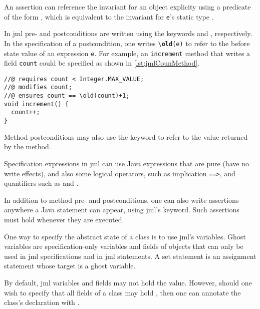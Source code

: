 An assertion can reference the invariant for an object explicity using
a predicate of the form , which is
equivalent to the invariant for \texttt{e}'s static type \cite[section
12.4.22]{Leavens&13}.

In \ac{jml} pre- and postconditions are written using the keywords
 and , respectively. In the specification of
a postcondition, one writes \texttt{\textbackslash \textbf{old}(e)} to
refer to the before state value of an expression \texttt{e}.  For
example, an \texttt{increment} method that writes a field
\texttt{count} could be specified as shown in
\autoref{lst:jmlCounMethod}.

\begin{lstlisting}[style=customJml,label={lst:jmlCounMethod},caption={Example of a \ac{jml} specification for a Java method.}]
//@ requires count < Integer.MAX_VALUE;
//@ modifies count;
//@ ensures count == \old(count)+1;
void increment() {
  count++;
}
\end{lstlisting}
Method postconditions may also use the keyword {\RESULT} to refer to
the value returned by the method.

Specification expressions in \ac{jml} can use Java expressions that
are pure (have no write effects), and also some logical operators,
such as implication \texttt{==>}, and quantifiers such as {\JMLforall}
and {\JMLexists}.

In addition to method pre- and postconditions, one can also write
assertions anywhere a Java statement can appear, using \ac{jml}'s
 keyword. Such assertions must hold whenever they are executed.

One way to specify the abstract state of a class is to use \ac{jml}'s
 variables. Ghost variables are specification-only variables
and fields of objects that can only be used in \ac{jml} specifications
and in \ac{jml}  statements. A set statement is an assignment
statement whose target is a ghost variable.

By default, \ac{jml} variables and fields may not hold the 
value. However, should one wish to specify that all fields of a class
may hold , then one can annotate the class's declaration with
.


